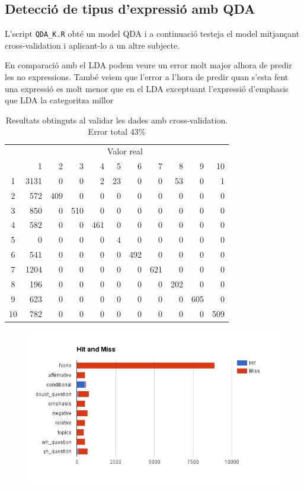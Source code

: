 \documentclass[a4paper]{article}
\begin{document}
\subsection{Detecció de tipus d'expressió amb QDA}
L’script \verb|QDA_K.R|  obté un model QDA i a continuació testeja el model mitjançant cross-validation i aplicant-lo a un altre subjecte.


En comparació amb el LDA podem veure un error molt major alhora de predir les no expressions. També veiem que l’error a l’hora de predir quan s’esta fent una expressió es molt menor que en el LDA exceptuant l’expressió d’emphasis que LDA la categoritza millor

\begin{table}[H]
	\centering
	\begin{tabular}{c|rrrrrrrrrr}
		& \multicolumn{10}{c}{Valor real} \\
		& 1 & 2 & 3 & 4 & 5 & 6 & 7 & 8 & 9 & 10 \\
		\hline
		1 & 3131 & 0 & 0 & 2 & 23 & 0 & 0 & 53 & 0 & 1 \\
		2 & 572 & 409 & 0 & 0 & 0 & 0 & 0 & 0 & 0 & 0 \\
		3 & 850 & 0 & 510 & 0 & 0 & 0 & 0 & 0 & 0 & 0 \\
		4 & 582 & 0 & 0 & 461 & 0 & 0 & 0 & 0 & 0 & 0 \\
		5 & 0 & 0 & 0 & 0 & 4 & 0 & 0 & 0 & 0 & 0 \\
		6 & 541 & 0 & 0 & 0 & 0 & 492 & 0 & 0 & 0 & 0 \\
		7 & 1204 & 0 & 0 & 0 & 0 & 0 & 621 & 0 & 0 & 0 \\
		8 & 196 & 0 & 0 & 0 & 0 & 0 & 0 & 202 & 0 & 0 \\
		9 & 623 & 0 & 0 & 0 & 0 & 0 & 0 & 0 & 605 & 0 \\
		10 & 782 & 0 & 0 & 0 & 0 & 0 & 0 & 0 & 0 & 509 \\
	\end{tabular}
	\caption{Resultats obtinguts al validar les dades amb cross-validation. Error total 43\%}
\end{table}

\begin{figure}[H]
	\centering
	\includegraphics[width=\textwidth]{images/image02}
\end{figure}
\end{document}
